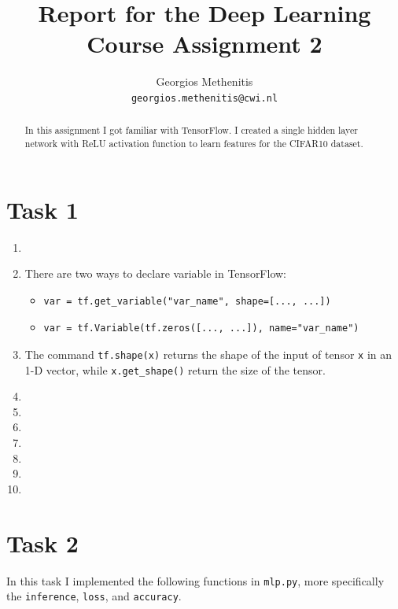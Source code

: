 \documentclass{article}
\title{Report for the Deep Learning Course Assignment 2 }
\author{
  Georgios Methenitis \\
  \texttt{georgios.methenitis@cwi.nl}
}
\begin{document}

\maketitle

\begin{abstract}
In this assignment I got familiar with TensorFlow. I created a single hidden layer network with ReLU activation function to learn features for the CIFAR10 dataset.
\end{abstract}

\section{Task 1}
\begin{enumerate}
\item 
\item There are two ways to declare variable in TensorFlow:
\begin{itemize}
\item \begin{small}
\begin{verbatim}
var = tf.get_variable("var_name", shape=[..., ...])
\end{verbatim}
\end{small}
\item \begin{small}
\begin{verbatim}
var = tf.Variable(tf.zeros([..., ...]), name="var_name")
\end{verbatim}
\end{small}
\end{itemize}

\item The command \texttt{tf.shape(x)} returns the shape of the input of tensor \texttt{x} in an 1-D vector, while \texttt{x.get\_shape()} return the size of the tensor.
\item
\item
\item
\item
\item
\item
\item
\end{enumerate}

\section{Task 2}
In this task I implemented the following functions in \texttt{mlp.py}, more specifically the \texttt{inference}, \texttt{loss}, and \texttt{accuracy}.
\end{document}
